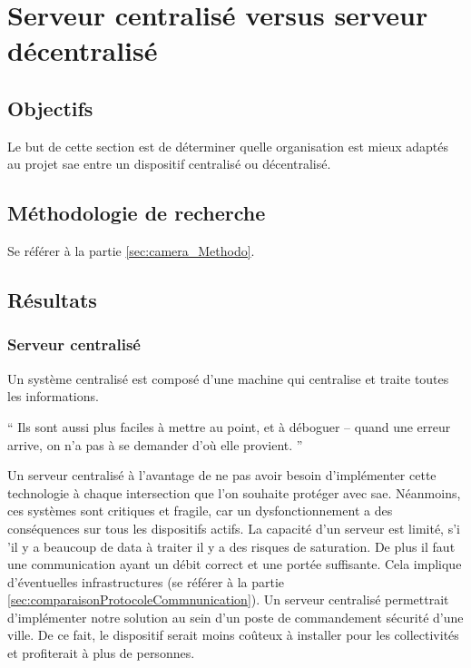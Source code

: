 
\section{Serveur centralisé versus serveur décentralisé}
\label{sec:centralise}

\subsection{Objectifs}
\label{sec:centralise_Objectifs}
Le but de cette section est de déterminer quelle organisation est mieux adaptés au projet \gls{sae} entre un dispositif centralisé ou décentralisé.

\subsection{Méthodologie de recherche}
\label{sec:centralise_Methodo}
Se référer à la partie \ref{sec:camera_Methodo}.

\subsection{Résultats}
\label{sec:centralise_Resultats}

\subsubsection{Serveur centralisé}
\label{sec:centralise_centralise}
Un système centralisé est composé d'une machine qui centralise et traite toutes les informations.

\enquote{
    Ils sont aussi plus faciles à mettre au point, et à déboguer – quand une erreur arrive, on n’a pas à se demander d’où elle provient.
}{\cite{centraliser}}

Un serveur centralisé à l'avantage de ne pas avoir besoin d'implémenter cette technologie à chaque intersection que l'on souhaite protéger avec \gls{sae}.
Néanmoins, ces systèmes sont critiques et fragile, car un dysfonctionnement a des conséquences sur tous les dispositifs actifs.
La capacité d'un serveur est limité, s'i 'il y a beaucoup de data à traiter il y a des risques de saturation.
De plus il faut une communication ayant un débit correct et une portée suffisante. Cela implique d'éventuelles infrastructures (se référer à la partie \ref{sec:comparaisonProtocoleCommnunication}).
Un serveur centralisé permettrait d'implémenter notre solution au sein d'un poste de commandement sécurité d'une ville. De ce fait,
le dispositif serait moins coûteux à installer pour les collectivités et profiterait à plus de personnes.

